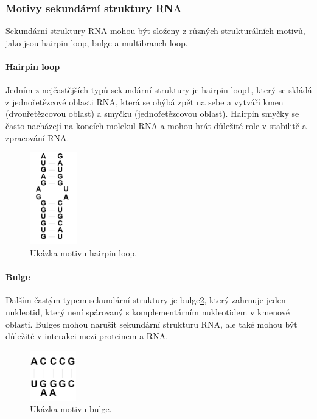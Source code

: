 \subsubsection{Motivy sekundární struktury RNA}

Sekundární struktury RNA mohou být složeny z různých strukturálních motivů,
jako jsou hairpin loop, bulge a multibranch loop.

\paragraph{Hairpin loop}

Jedním z nejčastějších typů sekundární struktury je hairpin loop\ref{hairpin}, který se
skládá z jednořetězcové oblasti RNA, která se ohýbá zpět na sebe a vytváří kmen
(dvouřetězcovou oblast) a smyčku (jednořetězcovou oblast). Hairpin smyčky se
často nacházejí na koncích molekul RNA a mohou hrát důležité role v stabilitě a
zpracování RNA.

\begin{figure}[H]
  \centering
  \includegraphics[height=40mm]{../img/kap01/rna/hairpin.png}
  \caption[Ukázka motivu hairpin loop]{Ukázka motivu hairpin loop.}
  \label{hairpin}
\end{figure}

\paragraph{Bulge}

Dalším častým typem sekundární struktury je bulge\ref{bulge}, který zahrnuje
jeden nukleotid, který není spárovaný s komplementárním nukleotidem v kmenové
oblasti. Bulges mohou narušit sekundární strukturu RNA, ale také mohou být
důležité v interakci mezi proteinem a RNA.

\begin{figure}[H]
  \centering
  \includegraphics[width=20mm]{../img/kap01/rna/bulge.png}
  \caption[Ukázka motivu bulge]{Ukázka motivu bulge.}
  \label{bulge}
\end{figure}

